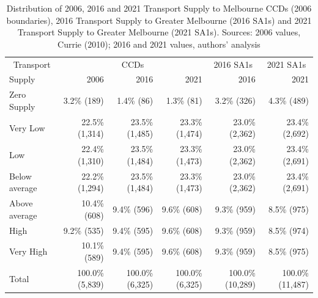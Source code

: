 \documentclass[preprint, 3p,
authoryear]{elsarticle} %
\begin{document}
\begin{table}

\caption{\label{tab:Greater_Melbourne_CCDs_SA1_table}Distribution of 2006, 2016 and 2021 Transport Supply to Melbourne CCDs (2006 boundaries), 2016 Transport Supply to Greater Melbourne (2016 SA1s) and 2021 Transport Supply to Greater Melbourne (2021 SA1s). Sources: 2006 values, Currie (2010); 2016 and 2021 values, authors' analysis}
\centering
\begin{tabular}[t]{l|r|r|r|r|r}
\hline
\multicolumn{1}{c|}{Transport} & \multicolumn{3}{c|}{CCDs} & \multicolumn{1}{c|}{2016 SA1s} & \multicolumn{1}{c}{2021 SA1s} \\
\cline{1-1} \cline{2-4} \cline{5-5} \cline{6-6}
Supply & 2006 & 2016 & 2021 & 2016 & 2021\\
\hline
Zero Supply & 3.2\%   (189) & 1.4\%    (86) & 1.3\%    (81) & 3.2\%    (326) & 4.3\%    (489)\\
\hline
Very Low & 22.5\% (1,314) & 23.5\% (1,485) & 23.3\% (1,474) & 23.0\%  (2,362) & 23.4\%  (2,692)\\
\hline
Low & 22.4\% (1,310) & 23.5\% (1,484) & 23.3\% (1,473) & 23.0\%  (2,362) & 23.4\%  (2,691)\\
\hline
Below average & 22.2\% (1,294) & 23.5\% (1,484) & 23.3\% (1,473) & 23.0\%  (2,362) & 23.4\%  (2,691)\\
\hline
Above average & 10.4\%   (608) & 9.4\%   (596) & 9.6\%   (608) & 9.3\%    (959) & 8.5\%    (975)\\
\hline
High & 9.2\%   (535) & 9.4\%   (595) & 9.6\%   (608) & 9.3\%    (959) & 8.5\%    (974)\\
\hline
Very High & 10.1\%   (589) & 9.4\%   (595) & 9.6\%   (608) & 9.3\%    (959) & 8.5\%    (975)\\
\hline
Total & 100.0\% (5,839) & 100.0\% (6,325) & 100.0\% (6,325) & 100.0\% (10,289) & 100.0\% (11,487)\\
\hline
\end{tabular}
\end{table}
\end{document}
